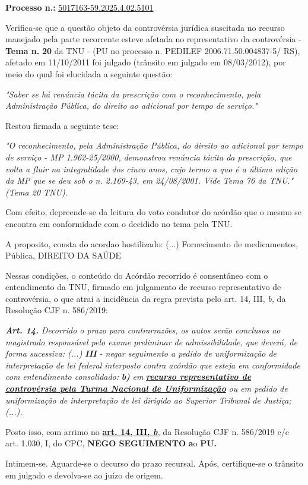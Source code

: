 \documentclass[12pt]{article}
\begin{document}
\justifying
\noindent \textbf{Processo n.: }\uline{5017163-59.2025.4.02.5101}

\noindent Verifica-se que a questão objeto da controvérsia jurídica suscitada no recurso manejado pela parte recorrente esteve afetada no representativo da controvérsia - \textbf{Tema n. }\textbf{20} da TNU - (PU no processo n. PEDILEF 2006.71.50.004837-5/ RS),  afetado em 11/10/2011 foi julgado (trânsito em julgado em 08/03/2012), por meio do qual foi elucidada a seguinte questão:

{\leftskip=3.1cm\rightskip=0.8cm\parindent=0pt \textit{"Saber se há renúncia tácita da prescrição com o reconhecimento, pela Administração Pública, do direito ao adicional por tempo de serviço."}\par}

\noindent Restou firmada a seguinte tese:

{\leftskip=3.1cm\rightskip=0.8cm\parindent=0pt \textit{"O reconhecimento, pela Administração Pública, do direito ao adicional por tempo de serviço - MP 1.962-25/2000, demonstrou renúncia tácita da prescrição, que volta a fluir na integralidade dos cinco anos, cujo termo a quo é a última edição da MP que se deu sob o n. 2.169-43, em 24/08/2001. Vide Tema 76 da TNU." (Tema 20 TNU).}\par}

\noindent Com efeito, depreende-se da leitura do voto condutor do acórdão que o mesmo se encontra em conformidade com o decidido no  tema pela TNU.

\noindent A proposito, consta do acordao hostilizado: (...) Fornecimento de medicamentos, Pública, DIREITO DA SAÚDE

\noindent Nessas condições, o conteúdo do Acórdão recorrido é consentâneo com o entendimento da TNU, firmado em julgamento de recurso representativo de controvérsia, o que atrai a incidência da regra prevista pelo art. 14, III, \textit{b,} da Resolução CJF n. 586/2019:

\noindent \textit{\textbf{Art. 14.}}\textit{ Decorrido o prazo para contrarrazões, os autos serão conclusos ao magistrado responsável pelo exame preliminar de admissibilidade, que deverá, de forma sucessiva: (...) }\textit{\textbf{III }}\textit{- negar seguimento a pedido de uniformização de interpretação de lei federal interposto contra acórdão que esteja em conformidade com entendimento consolidado: }\textit{\textbf{b)}}\textit{ em }\textit{\textbf{\uline{recurso representativo de controvérsia pela Turma Nacional de Uniformização}}}\textit{ ou em pedido de uniformização de interpretação de lei dirigido ao Superior Tribunal de Justiça;(...).}

\noindent Posto isso, com arrimo no \textbf{\uline{art. 14, III, }}\textit{\textbf{\uline{b}}}\textit{,} da Resolução CJF n. 586/2019 c/c art. 1.030, I, do CPC, \textbf{NEGO SEGUIMENTO }\textbf{a}o\textbf{ PU}\textbf{.}

\noindent Intimem-se. Aguarde-se o decurso do prazo recursal. Após, certifique-se o trânsito em julgado e devolva-se ao juízo de origem.
\end{document}
